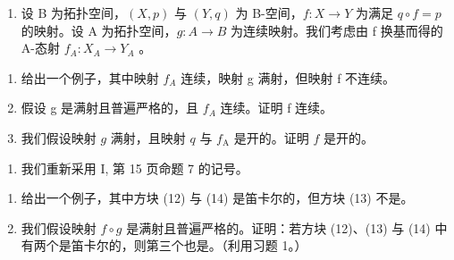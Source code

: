 \exercisegroup

\begin{enumerate}
\def\labelenumi{\arabic{enumi})}
\tightlist
\item
  设 B 为拓扑空间，\((X,p)\) 与 \((Y,q)\) 为 B-空间，\(f\colon X\to Y\) 为满足 \(q\circ f=p\) 的映射。设 A 为拓扑空间，\(g\colon A\to B\) 为连续映射。我们考虑由 f 换基而得的 A-态射 \(f_{A}\colon X_{A}\to Y_{A}\) 。
\end{enumerate}

\begin{enumerate}
\def\labelenumi{\alph{enumi})}
\item
  给出一个例子，其中映射 \(f_{A}\) 连续，映射 g 满射，但映射 f 不连续。
\item
  假设 g 是满射且普遍严格的，且 \(f_{A}\) 连续。证明 f 连续。
\item
  我们假设映射 \(g\) 满射，且映射 \(q\) 与 \(f_{\mathrm{A}}\) 是开的。证明 \(f\) 是开的。
\end{enumerate}

\begin{enumerate}
\def\labelenumi{\arabic{enumi})}
\setcounter{enumi}{1}
\tightlist
\item
  我们重新采用 I, 第 15 页命题 7 的记号。
\end{enumerate}

\begin{enumerate}
\def\labelenumi{\alph{enumi})}
\item
  给出一个例子，其中方块 (12) 与 (14) 是笛卡尔的，但方块 (13) 不是。
\item
  我们假设映射 \(f \circ g\) 是满射且普遍严格的。证明：若方块 (12)、(13) 与 (14) 中有两个是笛卡尔的，则第三个也是。（利用习题 1。）
\end{enumerate}

